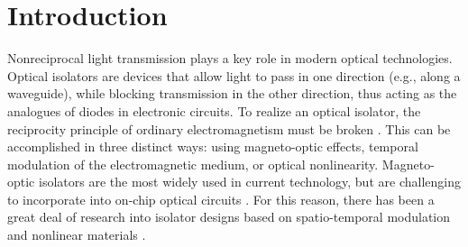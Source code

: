 \documentclass[aps,prx,twocolumn,superscriptaddress]{revtex4-1}
\begin{document}
\section{Introduction}

Nonreciprocal light transmission plays a key role in modern optical technologies.  Optical isolators are devices that allow light to pass in one direction (e.g., along a waveguide), while blocking transmission in the other direction, thus acting as the analogues of diodes in electronic circuits.  To realize an optical isolator, the reciprocity principle of ordinary electromagnetism must be broken \cite{jalas2013}.  This can be accomplished in three distinct ways: using magneto-optic effects, temporal modulation of the electromagnetic medium, or optical nonlinearity.  Magneto-optic isolators are the most widely used in current technology, but are challenging to incorporate into on-chip optical circuits \cite{soljacic_review,el2013apl,el2015ol}.  For this reason, there has been a great deal of research into isolator designs based on spatio-temporal modulation \cite{fan2009,longhi2015cpa} and nonlinear materials \cite{soljacic_review, scalora1994, tocci1995, Gallo2001, philip2007apl, Krause2008, Poulton2010, Ramezani2010, Miroschnichenko2010, lepri2011prl, anand2013nl, lepri2013pre, xu2014prb, li2014sp, peng2014nature, chang2014nature, Fan2015, zhou2016oe, jiang2016chip, li2017ssh, Sergey2016lpr}.
\end{document}
